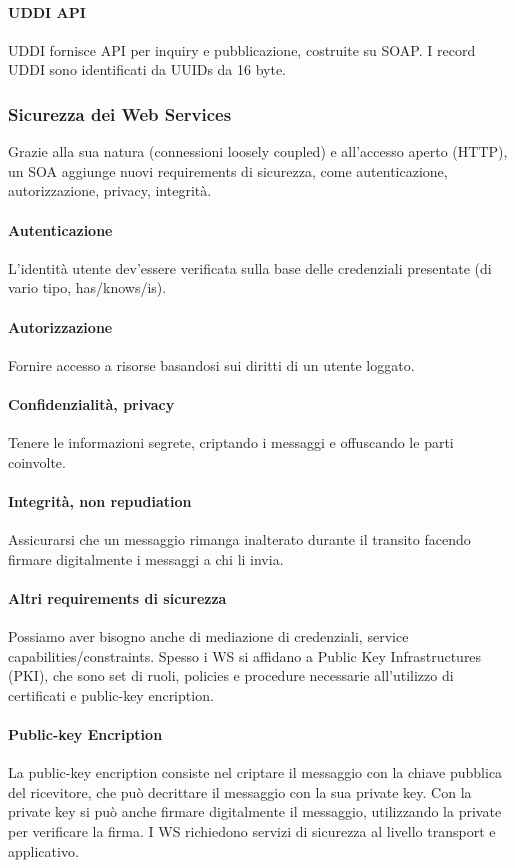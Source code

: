 \documentclass[11pt]{article}
\begin{document}
\paragraph{UDDI API} UDDI fornisce API per inquiry e pubblicazione, costruite su SOAP. I record UDDI sono identificati da UUIDs da 16 byte. 
\subsubsection{Sicurezza dei Web Services}
Grazie alla sua natura (connessioni loosely coupled) e all'accesso aperto (HTTP), un SOA aggiunge nuovi requirements di sicurezza, come autenticazione, autorizzazione, privacy, integrità.
\paragraph{Autenticazione} L'identità utente dev'essere verificata sulla base delle credenziali presentate (di vario tipo, has/knows/is).
\paragraph{Autorizzazione} Fornire accesso a risorse basandosi sui diritti di un utente loggato. 
\paragraph{Confidenzialità, privacy} Tenere le informazioni segrete, criptando i messaggi e offuscando le parti coinvolte.
\paragraph{Integrità, non repudiation} Assicurarsi che un messaggio rimanga inalterato durante il transito facendo firmare digitalmente i messaggi a chi li invia. 
\paragraph{Altri requirements di sicurezza} Possiamo aver bisogno anche di mediazione di credenziali, service capabilities/constraints. Spesso i WS si affidano a Public Key Infrastructures (PKI), che sono set di ruoli, policies e procedure necessarie all'utilizzo di certificati e public-key encription. 
\paragraph{Public-key Encription} La public-key encription consiste nel criptare il messaggio con la chiave pubblica del ricevitore, che può decrittare il messaggio con la sua private key. Con la private key si può anche firmare digitalmente il messaggio, utilizzando la private per verificare la firma. I WS richiedono servizi di sicurezza al livello transport e applicativo.   
\end{document}
